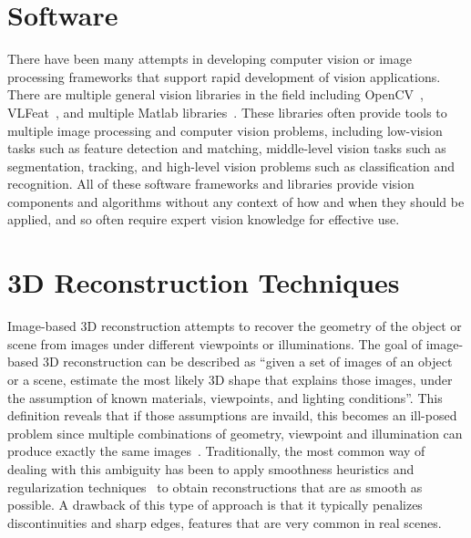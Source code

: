\section{Software}
There have been many attempts in developing computer vision or image processing frameworks that support rapid development of vision applications. There are multiple general vision libraries in the field including OpenCV~\cite{bradski2008learning}, VLFeat~\cite{vedaldi08vlfeat}, and multiple Matlab libraries~\cite{KovesiMATLABCode, MariottiniPr_RAM05}. These libraries often provide tools to multiple image processing and computer vision problems, including low-vision tasks such as feature detection and matching, middle-level vision tasks such as segmentation, tracking, and high-level vision problems such as classification and recognition. All of these software frameworks and libraries provide vision components and algorithms without any context of how and when they should be applied, and so often require expert vision knowledge for effective use.

\section{3D Reconstruction Techniques}
\label{sec:3DReconTech}

Image-based 3D reconstruction attempts to recover the geometry of the object or scene from images under different viewpoints or illuminations. The goal of image-based 3D reconstruction can be described as ``given a set of images of an object or a scene, estimate the most likely 3D shape that explains those images, under the assumption of known materials, viewpoints, and lighting conditions''. This definition reveals that if those assumptions are invaild, this becomes an ill-posed problem since multiple combinations of geometry, viewpoint and illumination can produce exactly the same images~\cite{poggio1985computational}. Traditionally, the most common way of dealing with this ambiguity has been to apply smoothness heuristics and regularization techniques~\cite{poggio1985computational} to obtain reconstructions that are as smooth as possible. A drawback of this type of approach is that it typically penalizes discontinuities and sharp edges, features that are very common in real scenes.

